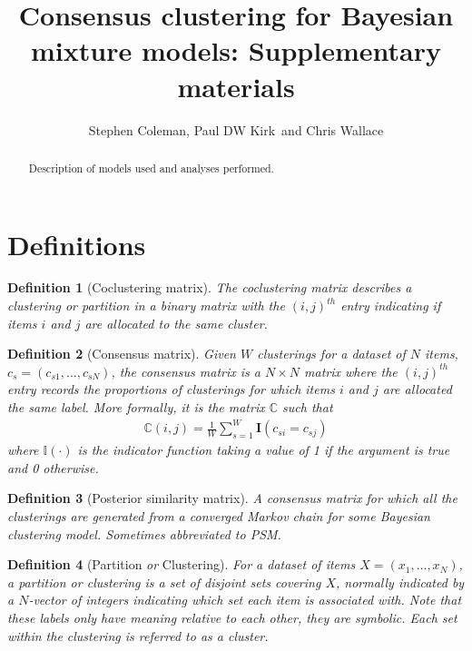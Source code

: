 \documentclass[]{article}
\title{Consensus clustering for Bayesian mixture models: Supplementary materials}
\author{Stephen Coleman, Paul DW Kirk\, and Chris Wallace}
\newtheorem{definition}{Definition}
\begin{document}
\maketitle

\begin{abstract}
Description of models used and analyses performed.
\end{abstract}


\section{Definitions}
\begin{definition}[Coclustering matrix]
	The \emph{coclustering matrix} describes a clustering or partition in a binary matrix with the $(i, j)^{th}$ entry indicating if items $i$ and $j$ are allocated to the same cluster.
\end{definition}

\begin{definition}[Consensus matrix]
	Given $W$ clusterings for a dataset of $N$ items, $c_s=(c_{s1}, \ldots, c_{sN})$, the \emph{consensus matrix} is a $N \times N$ matrix where the $(i, j )^{th}$ entry records the proportions of clusterings for which items $i$ and $j$ are allocated the same label. More formally, it is the matrix $\mathbb{C}$ such that
	\begin{align}
		\mathbb{C}(i, j) = \frac{1}{W} \sum_{s=1}^W \mathbf{I}(c_{si} = c_{sj})
	\end{align}
	where $\mathbb{I}(\cdot)$ is the indicator function taking a value of 1 if the argument is true and 0 otherwise.
\end{definition}

\begin{definition}[Posterior similarity matrix]
	A \emph{consensus matrix} for which all the clusterings are generated from a converged Markov chain for some Bayesian clustering model. Sometimes abbreviated to \emph{PSM}.
\end{definition}

\begin{definition}[Partition \emph{or} Clustering]
	For a dataset of items $X=(x_1, \ldots, x_N)$, a \emph{partition} or \emph{clustering} is a set of disjoint sets covering $X$, normally indicated by a $N$-vector of integers indicating which set each item is associated with. Note that these labels only have meaning relative to each other, they are symbolic. Each set within the clustering is referred to as a \emph{cluster}.
\end{definition}
\end{document}
